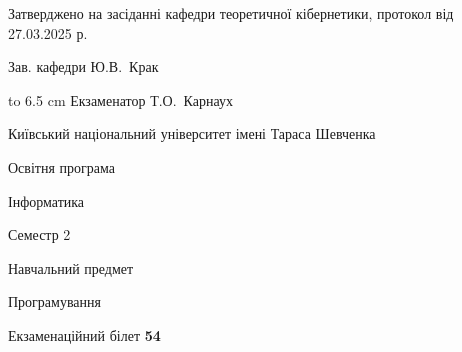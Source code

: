 \documentclass[12pt, ukrainian]{article}
\begin{document}
{\smallskip\smallskip \begin {scriptsize} Затверджено на засіданні кафедри теоретичної кібернетики, протокол   від   27.03.2025 р.\par\smallskip\smallskip\smallskip\smallskip
{\parbox {6.5 cm} {Зав. кафедри \dotfill Ю.В.~Крак}}\hspace {0.7cm} {\hbox to 6.5 cm { Екзаменатор \dotfill Т.О.~Карнаух}} \end{scriptsize}}
\newpage
{{\begin {scriptsize}\par
{ \center  Київський національний університет імені Тараса Шевченка \par}
{\parbox {5 cm}{Освітня програма \hfill}{\parbox {7 cm}{Інформатика\hfill}}\parbox {6 cm}{\hfill Семестр 2}}\par
{\parbox {5 cm} {Навчальний предмет \hfill}\parbox {7 cm}{Програмування \hfill}\parbox {6cm}{\hfill}\par}\vspace{-15pt} \end{scriptsize}}{\center Екзаменаційний білет \No \textbf { 54 }\par}}
\end{document}

